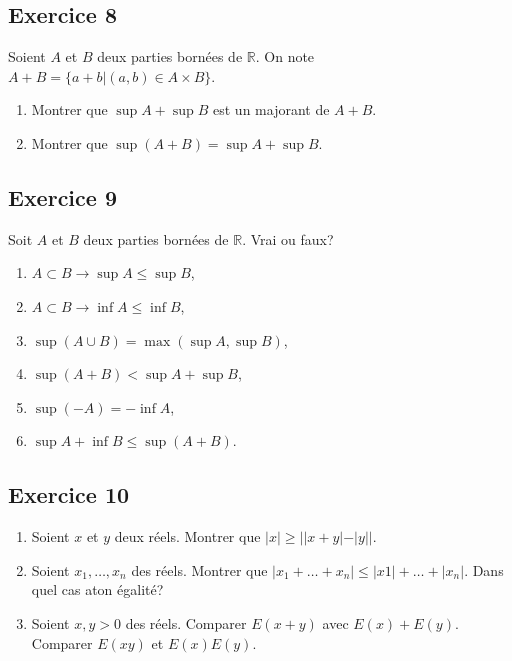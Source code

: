 \documentclass[letterpaper,10pt,french]{jupyterBook}
\begin{document}
\subsection{Exercice 8}
\label{\detokenize{exo1:exercice-8}}
\sphinxAtStartPar
Soient \(A\) et \(B\) deux parties bornées de \(\mathbb{R}\). On note \(A+B = \{a+b | (a,b) \in  A\times B\}\).
\begin{enumerate}
%
\item {} 
\sphinxAtStartPar
Montrer que \(\sup A+\sup B\) est un majorant de \(A+B\).

\item {} 
\sphinxAtStartPar
Montrer que \(\sup(A+B) = \sup A+\sup B\).

\end{enumerate}


\subsection{Exercice 9}
\label{\detokenize{exo1:exercice-9}}
\sphinxAtStartPar
Soit \(A\) et \(B\) deux parties bornées de \(\mathbb{R}\). Vrai ou faux?
\begin{enumerate}
%
\item {} 
\sphinxAtStartPar
\(A \subset B \rightarrow \sup A \leq \sup B\),

\item {} 
\sphinxAtStartPar
\(A \subset B \rightarrow \inf A \leq \inf B\),

\item {} 
\sphinxAtStartPar
\(\sup(A\cup B) = \max(\sup A,\sup B)\),

\item {} 
\sphinxAtStartPar
\(\sup(A+B) < \sup A+\sup B\),

\item {} 
\sphinxAtStartPar
\(\sup(−A) = −\inf A\),

\item {} 
\sphinxAtStartPar
\(\sup A+\inf B \leq \sup(A+B)\).

\end{enumerate}


\subsection{Exercice 10}
\label{\detokenize{exo1:exercice-10}}\begin{enumerate}
%
\item {} 
\sphinxAtStartPar
Soient \(x\) et \(y\) deux réels. Montrer que \(|x|\geq ||x+y|-|y||.\)

\item {} 
\sphinxAtStartPar
Soient \(x_1,\ldots,x_n\) des réels. Montrer que \(|x_1 +\ldots+ x_n|\leq|x1| + \ldots + |x_n|\). Dans quel cas a\sphinxhyphen{}t\sphinxhyphen{}on égalité?

\item {} 
\sphinxAtStartPar
Soient \(x, y > 0\) des réels. Comparer \(E(x + y)\) avec \(E(x)+E( y).\) Comparer \(E(xy)\) et \(E(x)E(y).\)

\end{enumerate}
\end{document}
